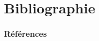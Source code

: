 \documentclass[12pt]{beamer}
\begin{document}
\section{Bibliographie}

\begin{frame}[allowframebreaks]
\frametitle{Références}
\scriptsize
%   
   
   
\end{frame}
\end{document}
